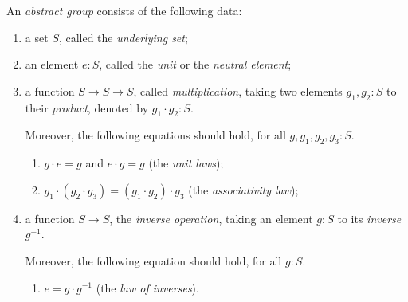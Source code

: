 \begin{definition}\label{def:abstractgroup}
  An \emph{abstract group} consists of the following data:
  \begin{enumerate}
  \item a set $S$, called the \emph{underlying set};
  \item an element $e:S$, called the \emph{unit} or the \emph{neutral element};
  \item\label{struc:mult-op} a function $S\to S\to S$, called \emph{multiplication},
    taking two elements $g_1,g_2:S$ to their \emph{product}, denoted by $g_1\cdot g_2:S$.
    \par \noindent
    Moreover, the following equations should hold, for all $g,g_1,g_2,g_3 : S$.
    \begin{enumerate}[label=(\alph*),ref=(\alph*)]
    \item\label{axiom:unit-laws} $g\cdot e=g$ and $e\cdot g=g$ (the \emph{unit laws});
    \item\label{axiom:ass-law} $g_1\cdot(g_2\cdot g_3)=(g_1\cdot g_2)\cdot g_3$ (the \emph{associativity law});
    \end{enumerate}
  \item\label{struc:inv-op} a function $S\to S$, the \emph{inverse operation},
    taking an element $g:S$ to its \emph{inverse} $g^{-1}$.
    \par \noindent
    Moreover, the following equation should hold, for all $g:S$.
    \begin{enumerate}[resume*]
    \item\label{axiom:inv-law} $ e = g\cdot g^{-1}$ (the \emph{law of inverses}).
    \qedhere
    \end{enumerate}
  \end{enumerate}
\end{definition}

